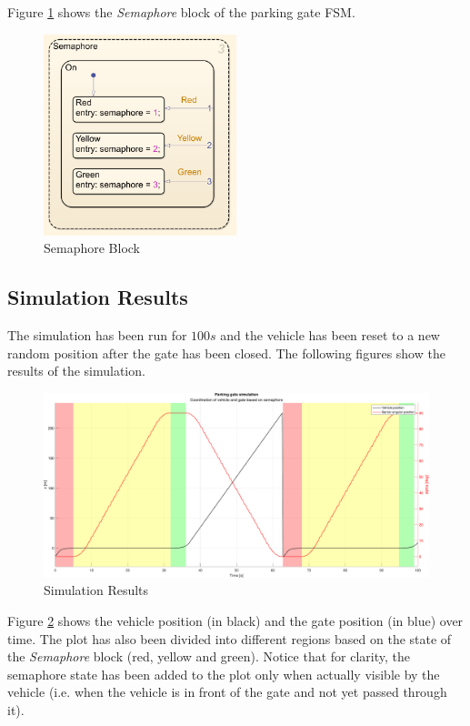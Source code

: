 Figure \ref{fig:semaphore_block} shows the \textit{Semaphore} block of the parking gate FSM.

\begin{figure}[H]
    \centering
    \includegraphics[width=0.5\textwidth]{./img/MATLAB/semaphore_block.png}
    \caption{Semaphore Block}
    \label{fig:semaphore_block}
\end{figure}



\subsection{Simulation Results}
\label{subsec:simulation_results}

The simulation has been run for $100s$ and the vehicle has been reset to a new random position after the gate has been closed.
The following figures show the results of the simulation.

\begin{figure}[H]
    \centering
    \includegraphics[width=1.0\textwidth]{./img/MATLAB/results.pdf}
    \caption{Simulation Results}
    \label{fig:simulation_results}
\end{figure}

Figure \ref{fig:simulation_results} shows the vehicle position (in black) and the gate position (in blue) over time.
The plot has also been divided into different regions based on the state of the \textit{Semaphore} block (red, yellow and green).
Notice that for clarity, the semaphore state has been added to the plot only when actually visible by the vehicle (i.e. when the vehicle is in front of the gate and not yet passed through it).

